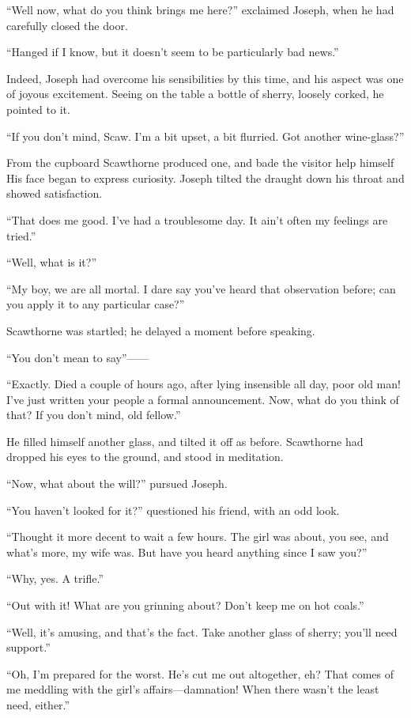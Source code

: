 ``Well now, what do you think brings me here?'' exclaimed Joseph, when
he had carefully closed the door.

``Hanged if I know, but it doesn't seem to be particularly bad news.''

Indeed, Joseph had overcome his sensibilities by this time, and his
aspect was one of joyous excitement. Seeing on the table a bottle of
sherry, loosely corked, he pointed to it.

``If you don't mind, Scaw. I'm a bit upset, a bit flurried. Got another
wine-glass?''

From the cupboard Scawthorne produced one, and bade the visitor help
himself His face began to express curiosity. Joseph tilted the draught
down his throat and showed satisfaction.

``That does me good. I've had a troublesome day. It ain't often my
feelings are tried.''

{\protect\hypertarget{173}{}{}}``Well, what is it?''

``My boy, we are all mortal. I dare say you've heard that observation
before; can you apply it to any particular case?''

Scawthorne was startled; he delayed a moment before speaking.

``You don't mean to say''{{------}}

``Exactly. Died a couple of hours ago, after lying insensible all day,
poor old man! I've just written your people a formal announcement. Now,
what do you think of that? If you don't mind, old fellow.''

He filled himself another glass, and tilted it off as before. Scawthorne
had dropped his eyes to the ground, and stood in meditation.

``Now, what about the will?'' pursued Joseph.

``You haven't looked for it?'' questioned his friend, with an odd look.

``Thought it more decent to wait a few hours. The girl was about, you
see, and what's more, my wife was. But have you heard anything since I
saw you?''

``Why, yes. A trifle.''

``Out with it! What are you grinning about? Don't keep me on hot
coals.''

``Well, it's amusing, and that's the fact.
{\protect\hypertarget{174}{}{}}Take another glass of sherry; you'll need
support.''

``Oh, I'm prepared for the worst. He's cut me out altogether, eh? That
comes of me meddling with the girl's affairs---damnation! When there
wasn't the least need, either.''

